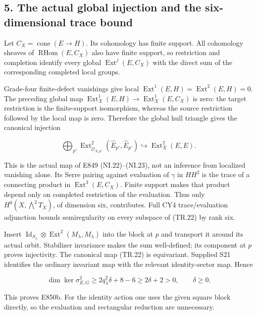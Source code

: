\subsection{5. The actual global injection and the six-dimensional trace bound}\label{SF-E850:s5}

Let \(C_X=\operatorname{cone}(E\to H)\). Its cohomology has finite support. All cohomology
sheaves of \(\operatorname{RHom}(E,C_X)\) also have finite support, so restriction and
completion identify every global \(\operatorname{Ext}^j(E,C_X)\) with the direct sum of
the corresponding completed local groups.

Grade-four finite-defect vanishings give local \(\operatorname{Ext}^1(E,H)=\operatorname{Ext}^2(E,H)=0\).
The preceding global map \(\operatorname{Ext}^1_X(E,H)\to \operatorname{Ext}^1_X(E,C_X)\) is zero: the
target restriction is the finite-support isomorphism, whereas the
source restriction followed by the local map is zero. Therefore the
global hull triangle gives the canonical injection

\[
 \bigoplus_{p'}\operatorname{Ext}^2_{\widehat{\mathcal O}_{X,p'}}
                  (\widehat E_{p'},\widehat E_{p'})
                  \hookrightarrow\operatorname{Ext}^2_X(E,E).
 \tag{TR.22}
\]

This is the actual map of E849 (NI.22)--(NI.23), not an inference from
localized vanishing alone. Its Serre pairing against evaluation of
\(\gamma\) in \(HH^2\) is the trace of a connecting product in \(\operatorname{Ext}^3(E,C_X)\).
Finite support makes that product depend only on completed restriction
of the evaluation. Thus only \(H^0(X,\bigwedge^2T_X)\), of dimension six,
contributes. Full CY4 trace/evaluation adjunction bounds semiregularity
on every subspace of (TR.22) by rank six.

Insert \(\operatorname{Id}_{S_\lambda}\otimes\operatorname{Ext}^2(M_\lambda,M_\lambda)\) into the block at
\(p\) and transport it around its actual orbit. Stabilizer invariance
makes the sum well-defined; its component at \(p\) proves injectivity.
The canonical map (TR.22) is equivariant. Supplied S21 identifies the
ordinary invariant map with the relevant identity-sector map. Hence

\[
 \dim\ker\sigma^2_{E,G}
    \ge 2q_\lambda^2\delta+8-6
    \ge2\delta+2>0,\qquad \delta\ge0.
 \tag{TR.23}
\]

This proves E850b. For the identity action one uses the given square
block directly, so the evaluation and rectangular reduction are unnecessary.

